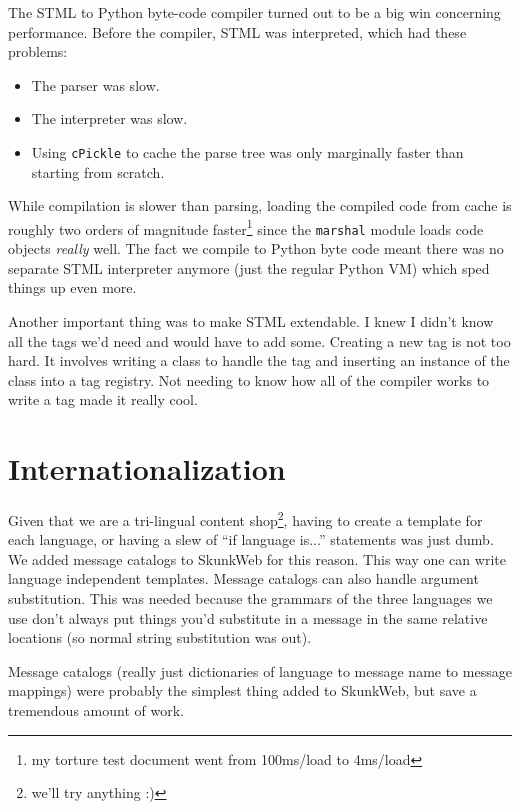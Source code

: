 \documentclass[twocolumn]{article}
\begin{document}
The STML to Python byte-code compiler turned out to be a big win concerning 
 performance.  Before the compiler, STML was
interpreted, which had these problems:
\begin{itemize}
\item The parser was slow.
\item The interpreter was slow.
\item Using \texttt{cPickle} to cache the parse tree was only
marginally faster than starting from scratch.
\end{itemize}

While compilation is slower than parsing, loading the compiled code
from cache is roughly two orders of magnitude faster\footnote{my
torture test document went from 100ms/load to 4ms/load} since the
\texttt{marshal} module loads code objects \emph{really} well.  The
fact we compile to Python byte code meant there was no
separate STML interpreter anymore (just the regular Python VM) which
sped things up even more.

Another important thing was to make STML extendable.  I knew I didn't
know all the tags we'd need and would have to add some.  Creating a
new tag is not too hard.  It involves writing a class to handle the
tag and inserting an instance of the class into a tag registry.  Not
needing to know how all of the compiler works to write a tag
made it really cool.


\section{Internationalization}
Given that we are a tri-lingual content shop\footnote{we'll try
anything :)}, having to create a template for each language, or having
a slew of ``if language is...'' statements was just dumb.  We added
message catalogs to SkunkWeb for this reason.  This way one can write
language independent templates.  Message catalogs can also handle
argument substitution.  This was needed because the grammars of the
three languages we use don't always put things you'd substitute in a
message in the same relative locations (so normal string substitution
was out).

Message catalogs (really just dictionaries of language to message
name to message mappings) were probably the simplest thing 
added to SkunkWeb, but save a tremendous amount of work.
\end{document}
